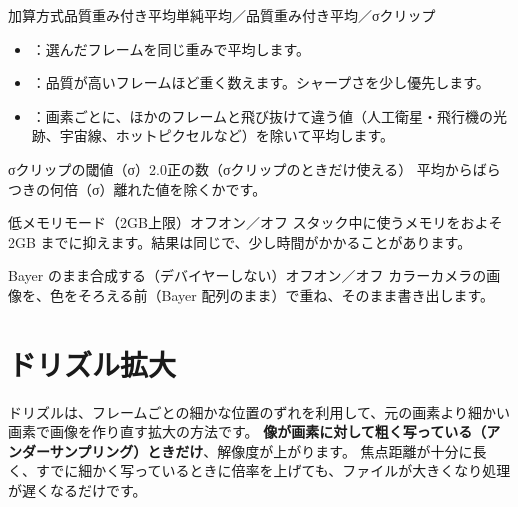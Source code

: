 \begin{setting}{ 加算方式}{品質重み付き平均}{単純平均／品質重み付き平均／σクリップ}
  \begin{itemize}[itemsep=0pt, topsep=2pt]
    \item {}：選んだフレームを同じ重みで平均します。
    \item {}：品質が高いフレームほど重く数えます。シャープさを少し優先します。
    \item {}：画素ごとに、ほかのフレームと飛び抜けて違う値（人工衛星・飛行機の光跡、宇宙線、ホットピクセルなど）を除いて平均します。
  \end{itemize}
\end{setting}

\begin{setting}{ σクリップの閾値（σ）}{2.0}{正の数（σクリップのときだけ使える）}
  平均からばらつきの何倍（σ）離れた値を除くかです。
\end{setting}

\begin{setting}{ 低メモリモード（2GB上限）}{オフ}{オン／オフ}
  スタック中に使うメモリをおよそ 2GB までに抑えます。結果は同じで、少し時間がかかることがあります。
\end{setting}

\begin{setting}{ Bayer のまま合成する（デバイヤーしない）}{オフ}{オン／オフ}
  カラーカメラの画像を、色をそろえる前（Bayer 配列のまま）で重ね、そのまま書き出します。
\end{setting}

\section{ドリズル拡大}\label{sec:drizzle}

ドリズルは、フレームごとの細かな位置のずれを利用して、元の画素より細かい画素で画像を作り直す拡大の方法です。
\textbf{像が画素に対して粗く写っている（アンダーサンプリング）ときだけ}、解像度が上がります。
焦点距離が十分に長く、すでに細かく写っているときに倍率を上げても、ファイルが大きくなり処理が遅くなるだけです。

